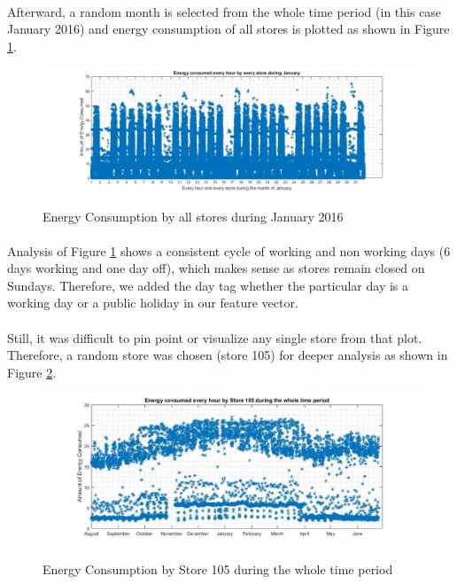 \documentclass[12pt]{article}
\begin{document}
\paragraph{}Afterward, a random month is selected from the whole time period (in this case January 2016) and energy consumption of all stores is plotted as shown in Figure \ref{0blockdiag}.

\begin{figure}[H]
	\centering
	{\includegraphics[scale=0.33]{Energy_alldays_allstores_jan.jpg}\label{0blockdiag}
	}
	\caption[The Block Diagram of the designed application]{Energy Consumption by all stores during January 2016}
	\label{0blockdiag}
	\hspace{0cm}%
\end{figure}

\paragraph{}Analysis of Figure \ref{0blockdiag} shows a consistent cycle of working and non working days (6 days working and one day off), which makes sense as stores remain closed on Sundays. Therefore, we added the day tag whether the particular day is a working day or a public holiday in our feature vector. 

\paragraph{}Still, it was difficult to pin point or visualize any single store from that plot. Therefore, a random store was chosen (store 105) for deeper analysis as shown in Figure \ref{101blockdiag}.

\begin{figure}[H]
	\centering
	{\includegraphics[scale=0.37]{new_105_jan_whole_year.jpg}\label{101blockdiag}
	}
	\caption[The Block Diagram of the designed application]{Energy Consumption by Store 105 during the whole time period}
	\label{101blockdiag}
	\hspace{0.7cm}%
\end{figure}
\end{document}
